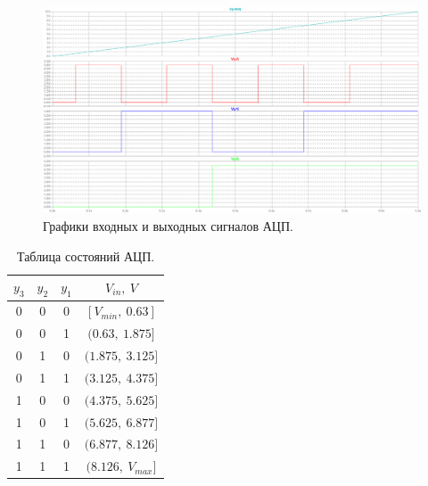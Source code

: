\documentclass[12pt]{article}
\begin{document}
\begin{figure}[H]
    \centering
    \includegraphics[width=\textwidth]{adc_in_out.png}
    \caption{Графики входных и выходных сигналов АЦП.}
    \label{fig:adc_in_out}
\end{figure}

\begin{table}[H]
    \centering
    \begin{tabular}{c | c | c | c} 
        $y_3$ & $y_2$ & $y_1$ & $V_{in}, \ V$ \\  
        \hline
        0 & 0 & 0 & $[V_{min}, \ 0.63]$ \\ 
        \hline
        0 & 0 & 1 & $(0.63, \ 1.875]$ \\ 
        \hline
        0 & 1 & 0 & $(1.875, \ 3.125]$ \\ 
        \hline
        0 & 1 & 1 & $(3.125, \ 4.375]$ \\ 
        \hline
        1 & 0 & 0 & $(4.375, \ 5.625]$ \\ 
        \hline
        1 & 0 & 1 & $(5.625, \ 6.877]$ \\ 
        \hline
        1 & 1 & 0 & $(6.877, \ 8.126]$ \\ 
        \hline
        1 & 1 & 1 & $(8.126, \ V_{max}]$ \\ 
    \end{tabular}
    \caption{Таблица состояний АЦП.}
    \label{table:1}
\end{table}
\end{document}
